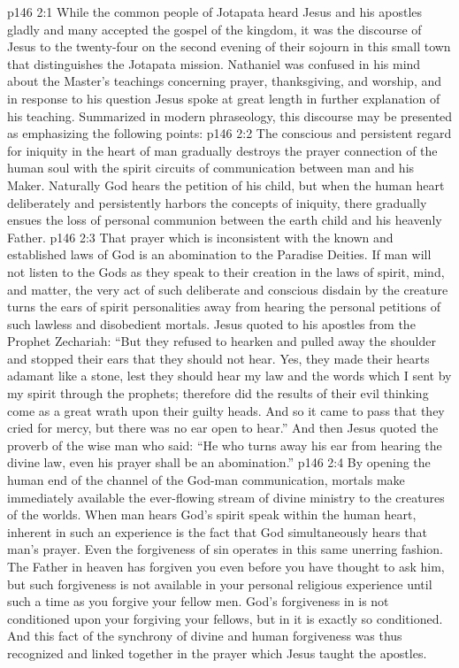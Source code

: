 \vs p146 2:1 While the common people of Jotapata heard Jesus and his apostles gladly and many accepted the gospel of the kingdom, it was the discourse of Jesus to the twenty\hyp{}four on the second evening of their sojourn in this small town that distinguishes the Jotapata mission. Nathaniel was confused in his mind about the Master’s teachings concerning prayer, thanksgiving, and worship, and in response to his question Jesus spoke at great length in further explanation of his teaching. Summarized in modern phraseology, this discourse may be presented as emphasizing the following points:
\pc \vs p146 2:2 \bibnobreakspace The conscious and persistent regard for iniquity in the heart of man gradually destroys the prayer connection of the human soul with the spirit circuits of communication between man and his Maker. Naturally God hears the petition of his child, but when the human heart deliberately and persistently harbors the concepts of iniquity, there gradually ensues the loss of personal communion between the earth child and his heavenly Father.
\pc \vs p146 2:3 \bibnobreakspace That prayer which is inconsistent with the known and established laws of God is an abomination to the Paradise Deities. If man will not listen to the Gods as they speak to their creation in the laws of spirit, mind, and matter, the very act of such deliberate and conscious disdain by the creature turns the ears of spirit personalities away from hearing the personal petitions of such lawless and disobedient mortals. Jesus quoted to his apostles from the Prophet Zechariah: “But they refused to hearken and pulled away the shoulder and stopped their ears that they should not hear. Yes, they made their hearts adamant like a stone, lest they should hear my law and the words which I sent by my spirit through the prophets; therefore did the results of their evil thinking come as a great wrath upon their guilty heads. And so it came to pass that they cried for mercy, but there was no ear open to hear.” And then Jesus quoted the proverb of the wise man who said: “He who turns away his ear from hearing the divine law, even his prayer shall be an abomination.”
\pc \vs p146 2:4 \bibnobreakspace By opening the human end of the channel of the God\hyp{}man communication, mortals make immediately available the ever\hyp{}flowing stream of divine ministry to the creatures of the worlds. When man hears God’s spirit speak within the human heart, inherent in such an experience is the fact that God simultaneously hears that man’s prayer. Even the forgiveness of sin operates in this same unerring fashion. The Father in heaven has forgiven you even before you have thought to ask him, but such forgiveness is not available in your personal religious experience until such a time as you forgive your fellow men. God’s forgiveness in  is not conditioned upon your forgiving your fellows, but in  it is exactly so conditioned. And this fact of the synchrony of divine and human forgiveness was thus recognized and linked together in the prayer which Jesus taught the apostles.
